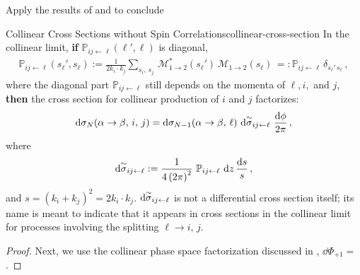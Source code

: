 \begin{exercise}
    \label{ex:gtoqq-split}
    Apply the results of \Example{} and \Exercise{} to conclude
\end{exercise}



\begin{lemma}{Collinear Cross Sections without Spin Correlations}{collinear-cross-section}
    In the collinear limit, \textbf{if} \(\mathbb{P}_{ij \leftarrow \ell}(\ell', \ell)\) is diagonal,
    \begin{align}
        \mathbb{P}_{ij \leftarrow \ell}(s_\ell', s_\ell)
        :=
        \frac{1}{2 k_i \cdot k_j}
        \sum_{s_i,\, s_j}
        \,
        \mathcal{M}^*_{1 \to 2}(s_\ell')
        \,
        \mathcal{M}_{1 \to 2}(s_\ell)
        \,
        =:
        \mathbb{P}_{ij \leftarrow \ell}
        \,
        \delta_{s_\ell'\, s_\ell}
        \,,
    \end{align}
    where the diagonal part \(\mathbb{P}_{ij \leftarrow \ell}\) still depends on the momenta of \(\ell, i,\) and \(j\), \textbf{then} the cross section for collinear production of \(i\) and \(j\) factorizes:
    \begin{align}
        \dd \sigma_N(\alpha \to \beta,\,i,\, j)
        =
        \dd \sigma_{N-1}(\alpha \to \beta,\,\ell)
        \,\,
        \dd \overset{\sim}{\sigma}_{ij\leftarrow \ell}
        \,\,
        \frac{\dd\phi}{2\pi}
        \,,
    \end{align}
    where
    \begin{align}
        \dd \overset{\sim}{\sigma}_{ij\leftarrow \ell}
        :=
        \frac{1}{4 \left(2 \pi\right)^2}
        \,\,
        \mathbb{P}_{ij\leftarrow \ell}
        \,\,
        \dd z
        \,
        \frac{\dd s}{s}
        \,,
    \end{align}
    and \(s = (k_i + k_j)^2 = 2 k_i \cdot k_j\).
    \(\dd \overset{\sim}{\sigma}_{ij\leftarrow \ell}\) is not a differential cross section itself;
    its name is meant to indicate that it appears in cross sections in the collinear limit for processes involving the splitting \(\ell \to i,\, j\).
\end{lemma}


\begin{proof}

    Next, we use the collinear phase space factorization discussed in , \(\dd\Phi_{+1} = \).

\end{proof}


